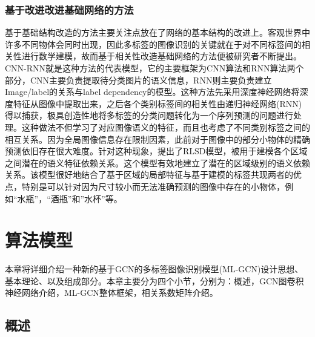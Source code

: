 \subsection{基于改进改进基础网络的方法}

基于基础结构改造的方法主要关注点放在了网络的基本结构的改进上。客观世界中许多不同物体会同时出现，因此多标签的图像识别的关键就在于对不同标签间的相关性进行数学建模，故而基于相关性改造基础网络的方法便被研究者不断提出。CNN-RNN就是这种方法的代表模型，它的主要框架为CNN算法和RNN算法两个部分，CNN主要负责提取待分类图片的语义信息，RNN则主要负责建立Image/label的关系与label dependency的模型。这种方法先采用深度神经网络将深度特征从图像中提取出来，之后各个类别标签间的相关性由递归神经网络(RNN)得以捕获，极具创造性地将多标签的分类问题转化为一个序列预测的问题进行处理。这种做法不但学习了对应图像语义的特征，而且也考虑了不同类别标签之间的相互关系。因为全局图像信息存在限制因素，此前对于图像中的部分小物体的精确预测依旧存在很大难度。针对这种现象，提出了RLSD模型，被用于建模各个区域之间潜在的语义特征依赖关系。这个模型有效地建立了潜在的区域级别的语义依赖关系。该模型很好地结合了基于区域的局部特征与基于建模的标签共现两者的优点，特别是可以针对因为尺寸较小而无法准确预测的图像中存在的小物体，例如“水瓶”，“酒瓶”和”水杯”等。

\chapter{算法模型}

本章将详细介绍一种新的基于GCN的多标签图像识别模型(ML-GCN)设计思想、基本理论、以及组成部分。本章主要分为四个小节，分别为：概述，GCN图卷积神经网络介绍，ML-GCN整体框架，相关系数矩阵介绍。

\section{概述}

